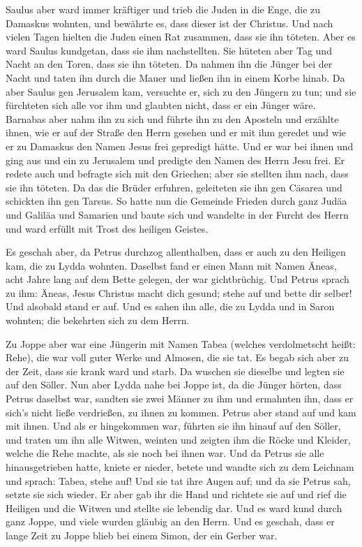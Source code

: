  Saulus aber ward immer kräftiger und trieb die Juden in
die Enge, die zu Damaskus wohnten, und bewährte es, dass dieser ist der
Christus.  Und nach vielen Tagen hielten die Juden einen
Rat zusammen, dass sie ihn töteten.  Aber es ward Saulus
kundgetan, dass sie ihm nachstellten. Sie hüteten aber Tag und Nacht an
den Toren, dass sie ihn töteten.  Da nahmen ihn die
Jünger bei der Nacht und taten ihn durch die Mauer und ließen ihn in
einem Korbe hinab.  Da aber Saulus gen Jerusalem kam,
versuchte er, sich zu den Jüngern zu tun; und sie fürchteten sich alle
vor ihm und glaubten nicht, dass er ein Jünger wäre. 
Barnabas aber nahm ihn zu sich und führte ihn zu den Aposteln und
erzählte ihnen, wie er auf der Straße den Herrn gesehen und er mit ihm
geredet und wie er zu Damaskus den Namen Jesus frei gepredigt hätte.
 Und er war bei ihnen und ging aus und ein zu Jerusalem
und predigte den Namen des Herrn Jesu frei.  Er redete
auch und befragte sich mit den Griechen; aber sie stellten ihm nach,
dass sie ihn töteten.  Da das die Brüder erfuhren,
geleiteten sie ihn gen Cäsarea und schickten ihn gen Tarsus.
 So hatte nun die Gemeinde Frieden durch ganz Judäa und
Galiläa und Samarien und baute sich und wandelte in der Furcht des Herrn
und ward erfüllt mit Trost des heiligen Geistes.

 Es geschah aber, da Petrus durchzog allenthalben, dass
er auch zu den Heiligen kam, die zu Lydda wohnten. 
Daselbst fand er einen Mann mit Namen Äneas, acht Jahre lang auf dem
Bette gelegen, der war gichtbrüchig.  Und Petrus sprach
zu ihm: Äneas, Jesus Christus macht dich gesund; stehe auf und bette dir
selber! Und alsobald stand er auf.  Und es sahen ihn
alle, die zu Lydda und in Saron wohnten; die bekehrten sich zu dem
Herrn.

 Zu Joppe aber war eine Jüngerin mit Namen Tabea (welches
verdolmetscht heißt: Rehe), die war voll guter Werke und Almosen, die
sie tat.  Es begab sich aber zu der Zeit, dass sie krank
ward und starb. Da wuschen sie dieselbe und legten sie auf den Söller.
 Nun aber Lydda nahe bei Joppe ist, da die Jünger hörten,
dass Petrus daselbst war, sandten sie zwei Männer zu ihm und ermahnten
ihn, dass er sich's nicht ließe verdrießen, zu ihnen zu kommen.
 Petrus aber stand auf und kam mit ihnen. Und als er
hingekommen war, führten sie ihn hinauf auf den Söller, und traten um
ihn alle Witwen, weinten und zeigten ihm die Röcke und Kleider, welche
die Rehe machte, als sie noch bei ihnen war.  Und da
Petrus sie alle hinausgetrieben hatte, kniete er nieder, betete und
wandte sich zu dem Leichnam und sprach: Tabea, stehe auf! Und sie tat
ihre Augen auf; und da sie Petrus sah, setzte sie sich wieder.
 Er aber gab ihr die Hand und richtete sie auf und rief
die Heiligen und die Witwen und stellte sie lebendig dar.
 Und es ward kund durch ganz Joppe, und viele wurden
gläubig an den Herrn.  Und es geschah, dass er lange Zeit
zu Joppe blieb bei einem Simon, der ein Gerber war.

